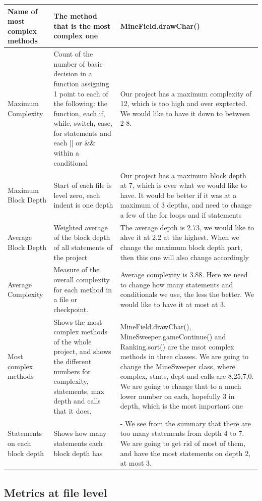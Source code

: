 \documentclass[UKenglish]{article}  %
\begin{document}
\begin{longtable}[H]{| m{1in} |  m{2in} | m{2in} |}
       \hline
       Name of most complex methods & The method that is the most complex one & MineField.drawChar()\\
       \hline
       Maximum Complexity & Count of the number of basic decision in a function assigning 1 point to each of the following: the function, each if, while, switch, case, for statements and each || or \&\& within a conditional & Our project has a maximum complexity of 12, which is too high and over exptected. We would like to have it down to between 2-8. \\
       \hline
       Maximum Block Depth & Start of each file is level zero, each indent is one depth & Our project has a maximum block depth at 7, which is over what we would like to have. It would be better if it was at a maximum of 3 depths, and need to change a few of the for loops and if statements \\
       \hline
       Average Block Depth & Weighted average of the block depth of all statements of the project & The average depth is 2.73, we would like to ahve it at 2.2 at the highest. When we change the maximum block depth part, then this one will also change accordingly \\
       \hline
       Average Complexity & Measure of the overall complexity for each method in a file or checkpoint. & Average complexity is 3.88. Here we need to change how many statements and conditionals we use, the less the better. We would like to have it at most at 3.\\
       \hline
       Most complex methods & Shows the most complex methods of the whole project, and shows the different numbers for complexity, statements, max depth and calls that it does. & MineField.drawChar(), MineSweeper.gameContinue() and Ranking.sort() are the msot complex methods in three classes. We are going to change the MineSweeper class, where complex, stmts, dept and calls are 8,25,7,0. We are going to change that to a much lower number on each, hopefully 3 in depth, which is the most important one\\ 
       \hline
       Statements on each block depth & Shows how many statements each block depth has & - We see from the summary that there are too many statements from depth 4 to 7. We are going to get rid of most of them, and have the most statements on depth 2, at most 3. \\
       \hline
\end{longtable}
\subsection{Metrics at file level}
\end{document}
